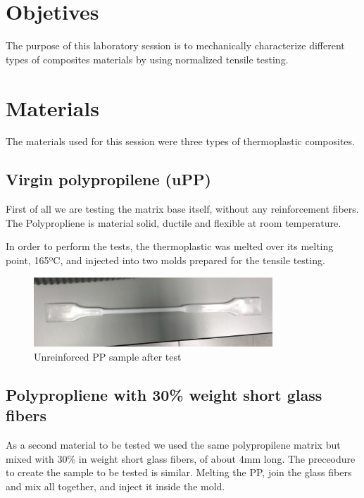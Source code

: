 \section{Objetives}

The purpose of this laboratory session is to mechanically characterize different
types of composites materials by using normalized tensile testing.\\

\section{Materials}

The materials used for this session were three types of thermoplastic composites.\\

\subsection{Virgin polypropilene (uPP)}

First of all we are testing the matrix base itself, without any reinforcement fibers.
The Polypropliene is material solid, ductile and flexible at room temperature.

In order to perform the tests, the thermoplastic was melted over its melting
point, 165ºC, and injected into two molds prepared for the tensile testing.\\

\begin{figure}[h]
	\centering
	\includegraphics[width=0.8\textwidth]{img/1_Unreinforced_PP.jpg}
	\caption[short caption]{Unreinforced PP sample after test}
	\label{fig:unreinforced_PP}
\end{figure}

\subsection{Polypropliene with 30\% weight short glass fibers}

As a second material to be tested we used the same polypropilene matrix but mixed
with 30\% in weight short glass fibers, of about 4mm long. The preceodure to create
the sample to be tested is similar. Melting the PP, join the glass fibers and mix
all together, and inject it inside the mold.\\

